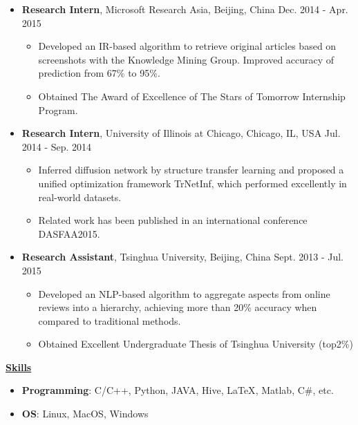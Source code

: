 \documentclass[11pt]{article}
\begin{document}
\begin{CJK}{GBK}{kai}
\begin{itemize}
   \item \textbf{Research Intern}, Microsoft Research Asia, Beijing, China \hfill Dec. 2014 - Apr. 2015\\
     \begin{itemize}
     \item Developed an IR-based algorithm to retrieve original articles based on screenshots with the Knowledge Mining Group. Improved accuracy of prediction from 67\% to 95\%.
     \item Obtained The Award of Excellence of The Stars of Tomorrow Internship Program.\\\medskip
     \end{itemize}

   \item \textbf{Research Intern}, University of Illinois at Chicago, Chicago, IL, USA \hfill Jul. 2014 - Sep. 2014\\
     \begin{itemize}
     \item Inferred diffusion network  by structure transfer learning and proposed a unified optimization framework TrNetInf, which performed excellently in real-world datasets.
     \item Related work has been published in an international conference DASFAA2015. \\\medskip
     \end{itemize}
  
   \item \textbf{Research Assistant}, Tsinghua University, Beijing, China \hfill Sept. 2013 - Jul. 2015\\
     \begin{itemize}
     \item Developed an NLP-based algorithm to aggregate aspects from online reviews into a hierarchy, achieving more than 20\% accuracy when compared to traditional methods. 
     \item Obtained Excellent Undergraduate Thesis of Tsinghua University (top2\%)
     \end{itemize}
\end{itemize}

\bigskip

{ \textbf{\underline{Skills}}}
\begin{itemize}
    \item \textbf{Programming}: C/C++, Python, JAVA, Hive, {\LaTeX},  Matlab, C\#, etc.%
    \item \textbf{OS}: Linux, MacOS, Windows
\end{itemize}

\end{CJK}
\end{document}
